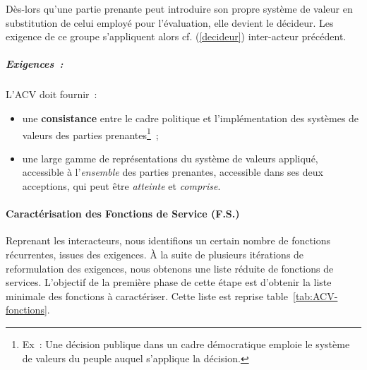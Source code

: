   Dès-lors qu'une partie prenante peut introduire son propre système de valeur en substitution de celui employé pour l'évaluation, elle devient le décideur.
  Les exigence de ce groupe s'appliquent alors cf. (\ref{decideur}) inter-acteur précédent.
  \subparagraph{Exigences~:}
  
  L'\gls{ACV} doit fournir~:
  
  \begin{itemize}[noitemsep,topsep=0pt,parsep=0pt,partopsep=0pt]
   \item une \textbf{consistance} entre le cadre politique et l'implémentation des systèmes de valeurs des parties prenantes\footnote{Ex~: Une décision publique dans un cadre démocratique emploie le système de valeurs du peuple auquel s'applique la décision.}~;
   \item une large gamme de représentations du système de valeurs appliqué, accessible à l'\emph{ensemble} des parties prenantes, accessible dans ses deux acceptions, qui peut être \emph{atteinte} et \emph{comprise}.
  \end{itemize}
  


\paragraph{Caractérisation des Fonctions de Service (F.S.)}

Reprenant les interacteurs, nous identifions un certain nombre de fonctions récurrentes, issues des exigences.
À la suite de plusieurs itérations de reformulation des exigences, nous obtenons une liste réduite de fonctions de services. %
L'objectif de la première phase de cette étape est d'obtenir la liste minimale des fonctions à caractériser.
Cette liste est reprise table~\ref{tab:ACV-fonctions}.


